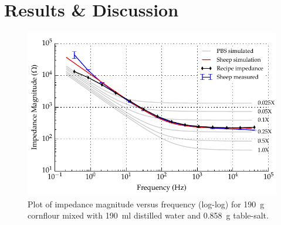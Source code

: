 %    
%    
%    
    
\section{Results \& Discussion}
  
  \begin{figure}
      \centering
      \includegraphics[width=\textwidth]{content/pt2/graphics/run12_190ml-distilledWater_190g-cornflour_0g858-salt_ZVsF_graph_mag}
      \caption{\label{fig:recipe_cornflour_salt_extraWater_mag_improved}Plot of impedance magnitude versus frequency (log-log) for \SI{190}{\gram} cornflour mixed with \SI{190}{\milli\litre} distilled water and \SI{0.858}{\gram} table-salt.}
  \end{figure}
  
